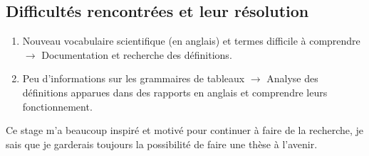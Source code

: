 \documentclass[12pt]{article}
\theoremstyle{definition}
\begin{document}
	 \subsection{Difficultés rencontrées et leur résolution}
	 \begin{enumerate}
	 	\item Nouveau vocabulaire scientifique (en anglais) et termes difficile à comprendre  $\rightarrow$ Documentation et recherche des définitions. 
	 	\item Peu d'informations sur les grammaires de tableaux $\rightarrow$ Analyse des définitions apparues dans des rapports en anglais et comprendre leurs fonctionnement.  
	 \end{enumerate} 
 
	Ce stage m'a beaucoup inspiré et motivé pour continuer à faire de la recherche, je sais que je garderais toujours la possibilité de faire une thèse à l'avenir. 
	
	
	
\end{document}
